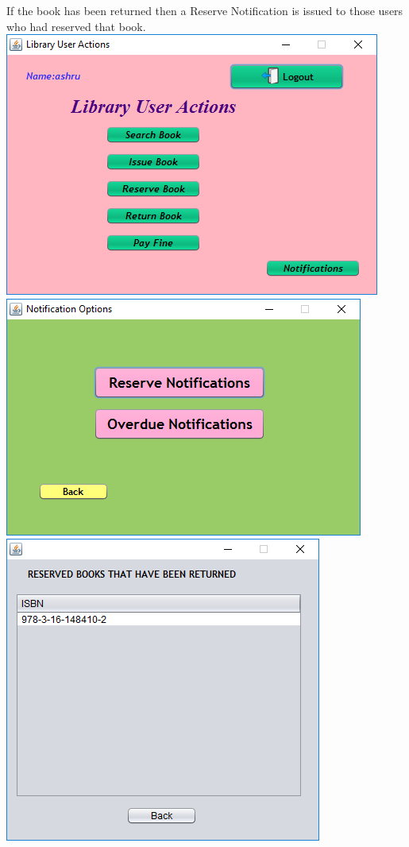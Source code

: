 \documentclass{article}
\begin{document}
\begin{enumerate}
\begin{itemize}
If the book has been returned then a Reserve Notification is issued to those users who had reserved that book.\\
\includegraphics[scale=0.8]{images/UserLogin/UserActions.PNG}\\
\includegraphics[scale=0.8]{images/UserLogin/Actions/NotificationWindow.PNG}\\
\includegraphics[scale=0.8]{images/UserLogin/Actions/Reserve_reserveNotif/ReserveNotif.PNG}\\


\end{itemize}
\end{enumerate}
\end{document}

